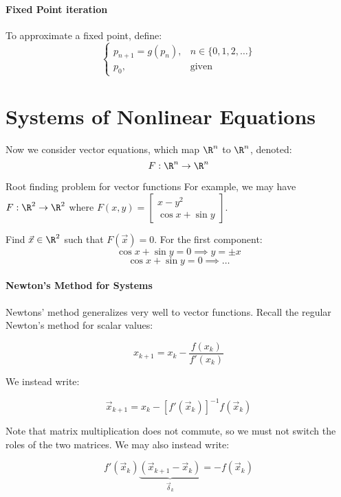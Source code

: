 

\paragraph{Fixed Point iteration}
To approximate a fixed point, define:
\[ \begin{cases}
    p_{n+1} = g(p_n), & n \in \{ 0, 1, 2, \ldots\} \\
    p_0, & \text{given}
\end{cases} \]



\section{Systems of Nonlinear Equations}
Now we consider vector equations, which map $\R^n$ to $\R^n$, denoted:
\[ F : \R^n \to \R^n \]


\begin{exbox}{Root finding problem for vector functions}{}
    For example, we may have $F : \R^2 \to \R^2$ where $F(x,y) = \begin{bmatrix} x-y^2 \\ \cos x + \sin y \end{bmatrix}$.

    Find $\vec{x} \in \R^2$ such that $F(\vec{x}) = 0$.
    \tcblower
    For the first component:
    \[ \cos x + \sin y = 0 \implies y = \pm x \]
    \[ \cos x + \sin y = 0 \implies \ldots \]
\end{exbox}

\paragraph{Newton's Method for Systems}
Newtons' method generalizes very well to vector functions. Recall the regular Newton's method for scalar values:

\[ x_{k+1} = x_k - \frac{f(x_k)}{f\prime(x_k)} \]

We instead write:

\[ \vec{x}_{k+1} = x_k - \left[ f\prime(\vec{x}_k) \right]^{-1} f(\vec{x}_k) \]

Note that matrix multiplication does not commute, so we must not switch the roles of the two matrices. We may also instead write:

\[ f\prime(\vec{x}_k) \underbrace{(\vec{x}_{k+1} - \vec{x}_k)}_{\vec{\delta}_k} = -f(\vec{x}_k) \]

